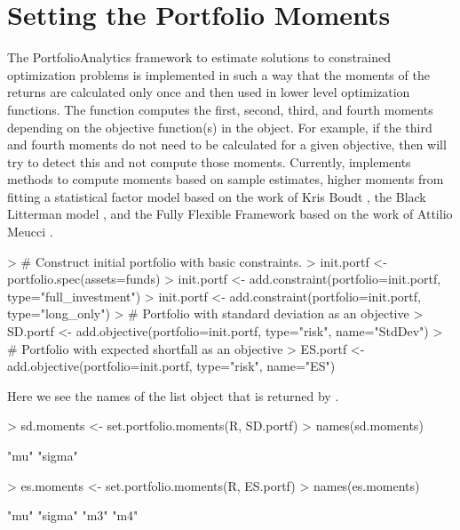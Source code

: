\documentclass[a4paper]{article}
\begin{document}
\section{Setting the Portfolio Moments}
The PortfolioAnalytics framework to estimate solutions to constrained optimization problems is implemented in such a way that the moments of the returns are calculated only once and then used in lower level optimization functions. The  function computes the first, second, third, and fourth moments depending on the objective function(s) in the  object. For example, if the third and fourth moments do not need to be calculated for a given objective, then  will try to detect this and not compute those moments. Currently,  implements methods to compute moments based on sample estimates, higher moments from fitting a statistical factor model based on the work of Kris Boudt \citep{Boudt2014}, the Black Litterman model \citep{MeucciBL2008}, and the Fully Flexible Framework based on the work of Attilio Meucci \citep{Meucci2008}.

\begin{Schunk}
\begin{Sinput}
> # Construct initial portfolio with basic constraints.
> init.portf <- portfolio.spec(assets=funds)
> init.portf <- add.constraint(portfolio=init.portf, type="full_investment")
> init.portf <- add.constraint(portfolio=init.portf, type="long_only")
> # Portfolio with standard deviation as an objective
> SD.portf <- add.objective(portfolio=init.portf, type="risk", name="StdDev")
> # Portfolio with expected shortfall as an objective
> ES.portf <- add.objective(portfolio=init.portf, type="risk", name="ES")
\end{Sinput}
\end{Schunk}

Here we see the names of the list object that is returned by .  
\begin{Schunk}
\begin{Sinput}
> sd.moments <- set.portfolio.moments(R, SD.portf)
> names(sd.moments)
\end{Sinput}
\begin{Soutput}
[1] "mu"    "sigma"
\end{Soutput}
\begin{Sinput}
> es.moments <- set.portfolio.moments(R, ES.portf)
> names(es.moments)
\end{Sinput}
\begin{Soutput}
[1] "mu"    "sigma" "m3"    "m4"   
\end{Soutput}
\end{Schunk}
\end{document}
